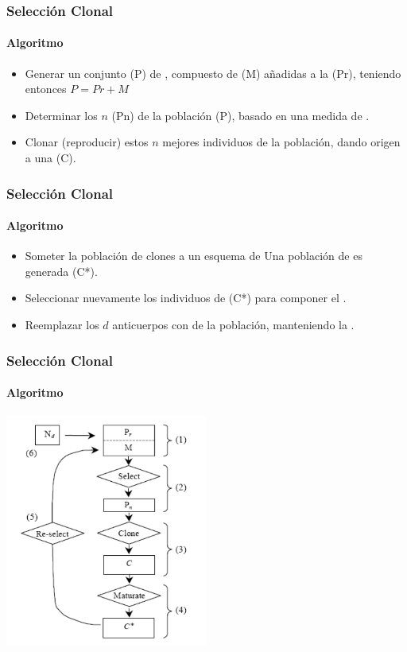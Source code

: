 \frame
{
\frametitle{Selección Clonal}
\framesubtitle{Algoritmo}

\begin{itemize}
    \item Generar un conjunto (P) de ,
        compuesto de  (M) añadidas a la
         (Pr), teniendo entonces $P = Pr + M$
    \item Determinar los $n$  (Pn) de la población (P),
        basado en una medida de .
    \item Clonar (reproducir) estos $n$ mejores individuos de la población,
        dando origen a una  (C).
\end{itemize}
}

\frame
{
\frametitle{Selección Clonal}
\framesubtitle{Algoritmo}

\begin{itemize}
    \item Someter la población de clones a un esquema de 
        Una población de  es generada (C*).
    \item Seleccionar nuevamente los  individuos de (C*)
        para componer el .
    \item Reemplazar los $d$ anticuerpos con  de la población,
        manteniendo la .
\end{itemize}

}


\frame
{
\frametitle{Selección Clonal}
\framesubtitle{Algoritmo}
\begin{center}
\includegraphics[width=0.5\textwidth]{../doc/img/algoritmo}
\end{center}
}

